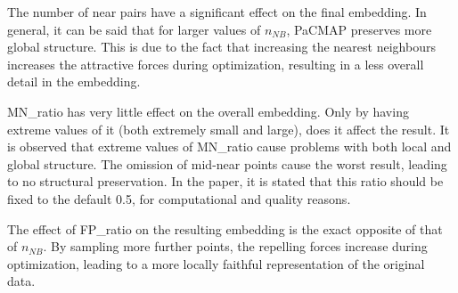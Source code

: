 The number of near pairs have a significant effect on the final embedding. In general, it can be said that for larger values of $n_{NB}$, PaCMAP preserves more global structure. This is due to the fact that increasing the nearest neighbours increases the attractive forces during optimization, resulting in a less overall detail in the embedding. 

MN\_ratio has very little effect on the overall embedding. Only by having extreme values of it (both extremely small and large), does it affect the result. It is observed that extreme values of MN\_ratio cause problems with both local and global structure. The omission of mid-near points cause the worst result, leading to no structural preservation. In the paper, it is stated that this ratio should be fixed to the default 0.5, for computational and quality reasons.

The effect of FP\_ratio on the resulting embedding is the exact opposite of that of $n_{NB}$. By sampling more further points, the repelling forces increase during optimization, leading to a more locally faithful representation of the original data.

